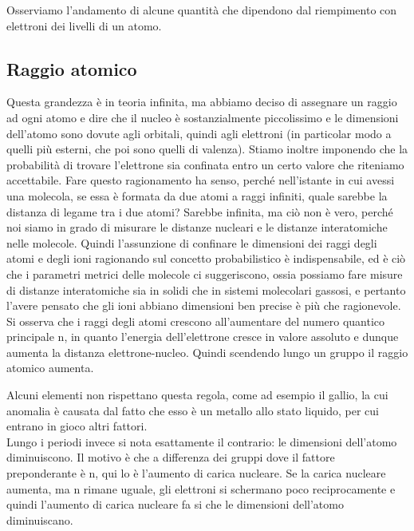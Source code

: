 Osserviamo l'andamento di alcune quantità che dipendono dal riempimento con elettroni dei livelli di un atomo.

\subsection{Raggio atomico}

Questa grandezza è in teoria infinita, ma abbiamo deciso di assegnare un raggio ad ogni atomo e dire che il nucleo è sostanzialmente piccolissimo e le dimensioni dell'atomo sono dovute agli orbitali, quindi agli elettroni (in particolar modo a quelli più esterni, che poi sono quelli di valenza). Stiamo inoltre imponendo che la probabilità di trovare l'elettrone sia confinata entro un certo valore che riteniamo accettabile. Fare questo ragionamento ha senso, perché nell'istante in cui avessi una molecola, se essa è formata da due atomi a raggi infiniti, quale sarebbe la distanza di legame tra i due atomi? Sarebbe infinita, ma ciò non è vero, perché noi siamo in grado di misurare le distanze nucleari e le distanze interatomiche nelle molecole. Quindi l'assunzione di confinare le dimensioni dei raggi degli atomi e degli ioni ragionando sul concetto probabilistico è indispensabile, ed è ciò che i parametri metrici delle molecole ci suggeriscono, ossia possiamo fare misure di distanze interatomiche sia in solidi che in sistemi molecolari gassosi, e pertanto l'avere pensato che gli ioni abbiano dimensioni ben precise è più che ragionevole.\\

Si osserva che i raggi degli atomi crescono all'aumentare del numero quantico principale n, in quanto l'energia dell'elettrone cresce in valore assoluto e dunque aumenta la distanza elettrone-nucleo. Quindi scendendo lungo un gruppo il raggio atomico aumenta.

Alcuni elementi non rispettano questa regola, come ad esempio il gallio, la cui anomalia è causata dal fatto che esso è un metallo allo stato liquido, per cui entrano in gioco altri fattori.\\

Lungo i periodi invece si nota esattamente il contrario: le dimensioni dell'atomo diminuiscono. Il motivo è che a differenza dei gruppi dove il fattore preponderante è n, qui lo è l'aumento di carica nucleare. Se la carica nucleare aumenta, ma n rimane uguale, gli elettroni si schermano poco reciprocamente e quindi l'aumento di carica nucleare fa si che le dimensioni dell'atomo diminuiscano.

